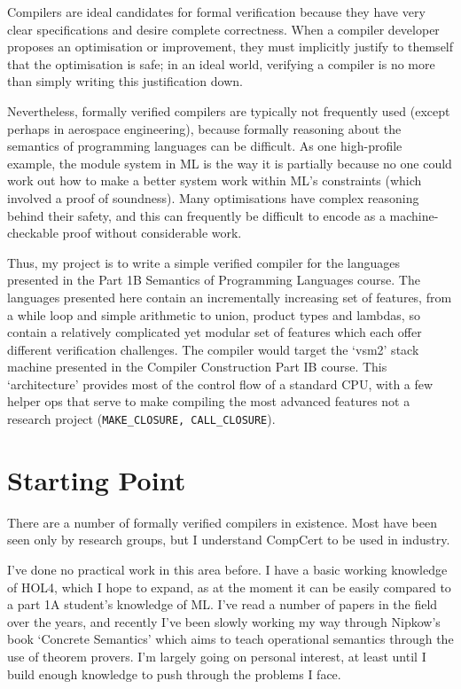 \documentclass[12pt,a4paper,twoside]{article}
\begin{document}
Compilers are ideal candidates for formal verification because they have very
clear specifications and desire complete correctness. When a compiler developer
proposes an optimisation or improvement, they must implicitly justify to
themself that the optimisation is safe; in an ideal world, verifying a compiler
is no more than simply writing this justification down.

Nevertheless, formally verified compilers are typically not frequently used
(except perhaps in aerospace engineering), because formally reasoning about
the semantics of programming languages can be difficult. As one high-profile
example, the module system in ML is the way it is partially because no one
could work out how to make a better system work within ML's constraints
(which involved a proof of soundness). Many optimisations have complex
reasoning behind their safety, and this can frequently be difficult to
encode as a machine-checkable proof without considerable work.

Thus, my project is to write a simple verified compiler for the languages presented
in the Part 1B Semantics of Programming Languages course. The languages presented
here contain an incrementally increasing set of features, from a while loop
and simple arithmetic to union, product types and lambdas, so contain
a relatively complicated yet modular set of features which each offer different
verification challenges. The compiler would target the `vsm2' stack machine
presented in the Compiler Construction Part IB course. This `architecture' provides
most of the control flow of a standard CPU, with a few helper ops that serve
to make compiling the most advanced features not a research project (\texttt{MAKE\_CLOSURE,
CALL\_CLOSURE}).

\section*{Starting Point}
There are a number of formally verified compilers in existence. Most have
been seen only by research groups, but I understand CompCert to be used
in industry.

I've done no practical work in this area before. I have a basic working knowledge
of HOL4, which I hope to expand, as at the moment it can be easily compared to a
part 1A student's knowledge of ML. I've read a number of papers in the field
over the years, and recently I've been slowly working my way through Nipkow's book
`Concrete Semantics' which aims to teach operational semantics through the use
of theorem provers. I'm largely going on personal interest, at least until I build
enough knowledge to push through the problems I face.
\end{document}
